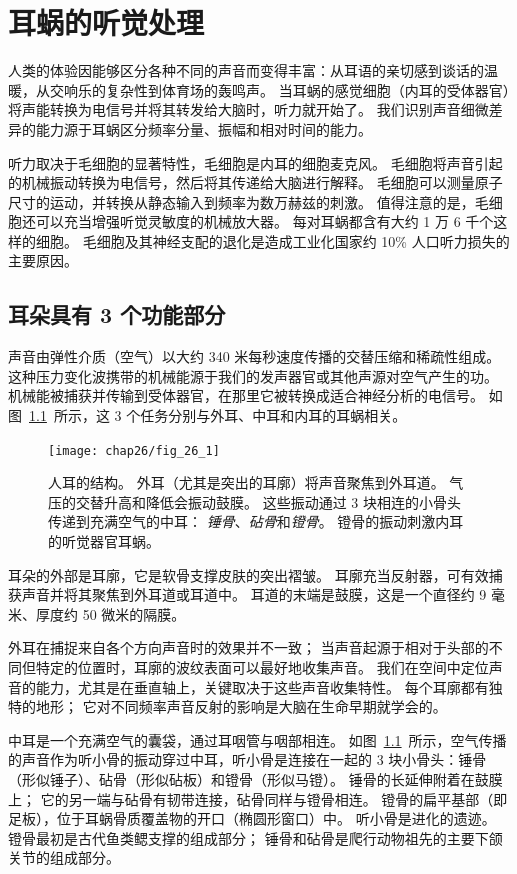 \chapter{耳蜗的听觉处理} \label{chap:chap26}

人类的体验因能够区分各种不同的声音而变得丰富：从耳语的亲切感到谈话的温暖，从交响乐的复杂性到体育场的轰鸣声。
当耳蜗的感觉细胞（内耳的受体器官）将声能转换为电信号并将其转发给大脑时，听力就开始了。
我们识别声音细微差异的能力源于耳蜗区分频率分量、振幅和相对时间的能力。


听力取决于毛细胞的显著特性，毛细胞是内耳的细胞麦克风。
毛细胞将声音引起的机械振动转换为电信号，然后将其传递给大脑进行解释。
毛细胞可以测量原子尺寸的运动，并转换从静态输入到频率为数万赫兹的刺激。
值得注意的是，毛细胞还可以充当增强听觉灵敏度的机械放大器。
每对耳蜗都含有大约 1 万 6 千个这样的细胞。
毛细胞及其神经支配的退化是造成工业化国家约 10\% 人口听力损失的主要原因。



\section{耳朵具有 3 个功能部分}

声音由弹性介质（空气）以大约 340 米每秒速度传播的交替压缩和稀疏性组成。
这种压力变化波携带的机械能源于我们的发声器官或其他声源对空气产生的功。
机械能被捕获并传输到受体器官，在那里它被转换成适合神经分析的电信号。
如图~\ref{fig:26_1}~所示，这 3 个任务分别与外耳、中耳和内耳的耳蜗相关。


\begin{figure}[htbp]
	\centering
	\texttt{[image: chap26/fig\_26\_1]}
	\caption{人耳的结构。 
		外耳（尤其是突出的耳廓）将声音聚焦到外耳道。
		气压的交替升高和降低会振动鼓膜。
		这些振动通过 3 块相连的小骨头传递到充满空气的中耳：
		\textit{锤骨}、\textit{砧骨}和\textit{镫骨}。
		镫骨的振动刺激内耳的听觉器官耳蜗。}
	\label{fig:26_1}
\end{figure}


耳朵的外部是耳廓，它是软骨支撑皮肤的突出褶皱。
耳廓充当反射器，可有效捕获声音并将其聚焦到外耳道或耳道中。
耳道的末端是鼓膜，这是一个直径约 9 毫米、厚度约 50 微米的隔膜。


外耳在捕捉来自各个方向声音时的效果并不一致；
当声音起源于相对于头部的不同但特定的位置时，耳廓的波纹表面可以最好地收集声音。
我们在空间中定位声音的能力，尤其是在垂直轴上，关键取决于这些声音收集特性。
每个耳廓都有独特的地形；
它对不同频率声音反射的影响是大脑在生命早期就学会的。


中耳是一个充满空气的囊袋，通过耳咽管与咽部相连。
如图~\ref{fig:26_1}~所示，空气传播的声音作为听小骨的振动穿过中耳，听小骨是连接在一起的 3 块小骨头：锤骨（形似锤子）、砧骨（形似砧板）和镫骨（形似马镫）。
锤骨的长延伸附着在鼓膜上；
它的另一端与砧骨有韧带连接，砧骨同样与镫骨相连。
镫骨的扁平基部（即足板），位于耳蜗骨质覆盖物的开口（椭圆形窗口）中。
听小骨是进化的遗迹。
镫骨最初是古代鱼类鳃支撑的组成部分；
锤骨和砧骨是爬行动物祖先的主要下颌关节的组成部分。


